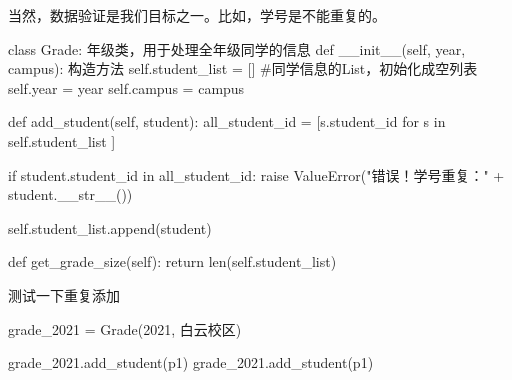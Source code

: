 \documentclass[
  letterpaper,
  DIV=11,
  numbers=noendperiod]{scrreprt}
\newenvironment{Shaded}{\begin{snugshade}}{\end{snugshade}}
\newcommand{\BuiltInTok}[1]{\textcolor[rgb]{0.00,0.23,0.31}{#1}}
\newcommand{\CommentTok}[1]{\textcolor[rgb]{0.37,0.37,0.37}{#1}}
\newcommand{\ControlFlowTok}[1]{\textcolor[rgb]{0.00,0.23,0.31}{#1}}
\newcommand{\DecValTok}[1]{\textcolor[rgb]{0.68,0.00,0.00}{#1}}
\newcommand{\FunctionTok}[1]{\textcolor[rgb]{0.28,0.35,0.67}{#1}}
\newcommand{\KeywordTok}[1]{\textcolor[rgb]{0.00,0.23,0.31}{#1}}
\newcommand{\NormalTok}[1]{\textcolor[rgb]{0.00,0.23,0.31}{#1}}
\newcommand{\OperatorTok}[1]{\textcolor[rgb]{0.37,0.37,0.37}{#1}}
\newcommand{\PreprocessorTok}[1]{\textcolor[rgb]{0.68,0.00,0.00}{#1}}
\newcommand{\StringTok}[1]{\textcolor[rgb]{0.13,0.47,0.30}{#1}}
\newcommand{\VariableTok}[1]{\textcolor[rgb]{0.07,0.07,0.07}{#1}}
\begin{document}
当然，数据验证是我们目标之一。比如，学号是不能重复的。

\begin{Shaded}
\begin{Highlighting}[]
\KeywordTok{class}\NormalTok{ Grade:}
    \CommentTok{\textquotesingle{}\textquotesingle{}\textquotesingle{}}
\CommentTok{    年级类，用于处理全年级同学的信息}
\CommentTok{    \textquotesingle{}\textquotesingle{}\textquotesingle{}}
    \KeywordTok{def} \FunctionTok{\_\_init\_\_}\NormalTok{(}\VariableTok{self}\NormalTok{, year, campus):}
        \CommentTok{\textquotesingle{}\textquotesingle{}\textquotesingle{}}
\CommentTok{        构造方法}
\CommentTok{        \textquotesingle{}\textquotesingle{}\textquotesingle{}}
        \VariableTok{self}\NormalTok{.student\_list }\OperatorTok{=}\NormalTok{ [] }\CommentTok{\#同学信息的List，初始化成空列表}
        \VariableTok{self}\NormalTok{.year }\OperatorTok{=}\NormalTok{ year}
        \VariableTok{self}\NormalTok{.campus }\OperatorTok{=}\NormalTok{ campus}
    
    \KeywordTok{def}\NormalTok{ add\_student(}\VariableTok{self}\NormalTok{, student):}
\NormalTok{        all\_student\_id }\OperatorTok{=}\NormalTok{ [s.student\_id }\ControlFlowTok{for}\NormalTok{ s }\KeywordTok{in} \VariableTok{self}\NormalTok{.student\_list ]}
        
        \ControlFlowTok{if}\NormalTok{ student.student\_id }\KeywordTok{in}\NormalTok{ all\_student\_id:}
            \ControlFlowTok{raise} \PreprocessorTok{ValueError}\NormalTok{(}\StringTok{"错误！学号重复："} \OperatorTok{+}\NormalTok{ student.}\FunctionTok{\_\_str\_\_}\NormalTok{())}
        
        \VariableTok{self}\NormalTok{.student\_list.append(student)}
      
    \KeywordTok{def}\NormalTok{ get\_grade\_size(}\VariableTok{self}\NormalTok{):}
        \ControlFlowTok{return} \BuiltInTok{len}\NormalTok{(}\VariableTok{self}\NormalTok{.student\_list)}
\end{Highlighting}
\end{Shaded}

测试一下重复添加

\begin{Shaded}
\begin{Highlighting}[]
\NormalTok{grade\_2021 }\OperatorTok{=}\NormalTok{ Grade(}\DecValTok{2021}\NormalTok{, }\StringTok{\textquotesingle{}白云校区\textquotesingle{}}\NormalTok{)}

\NormalTok{grade\_2021.add\_student(p1)}
\NormalTok{grade\_2021.add\_student(p1)}
\end{Highlighting}
\end{Shaded}
\end{document}

